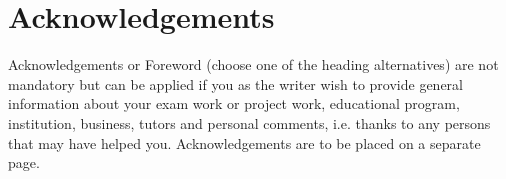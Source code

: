 \section*{Acknowledgements}
\label{ch:acknowledgements}
Acknowledgements or Foreword (choose one of the heading alternatives) are not mandatory but can be applied if you as the writer wish to provide general information about your exam work or project work, educational program, institution, business, tutors and personal comments, i.e. thanks to any persons that may have helped you. Acknowledgements are to be placed on a separate page.